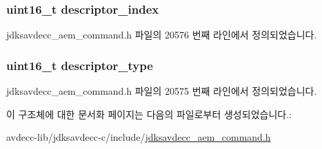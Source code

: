 \subsubsection[{\texorpdfstring{descriptor\+\_\+index}{descriptor_index}}]{\setlength{\rightskip}{0pt plus 5cm}uint16\+\_\+t descriptor\+\_\+index}\hypertarget{structjdksavdecc__aem__command__set__mixer__response_a042bbc76d835b82d27c1932431ee38d4}{}\label{structjdksavdecc__aem__command__set__mixer__response_a042bbc76d835b82d27c1932431ee38d4}


jdksavdecc\+\_\+aem\+\_\+command.\+h 파일의 20576 번째 라인에서 정의되었습니다.

\subsubsection[{\texorpdfstring{descriptor\+\_\+type}{descriptor_type}}]{\setlength{\rightskip}{0pt plus 5cm}uint16\+\_\+t descriptor\+\_\+type}\hypertarget{structjdksavdecc__aem__command__set__mixer__response_ab7c32b6c7131c13d4ea3b7ee2f09b78d}{}\label{structjdksavdecc__aem__command__set__mixer__response_ab7c32b6c7131c13d4ea3b7ee2f09b78d}


jdksavdecc\+\_\+aem\+\_\+command.\+h 파일의 20575 번째 라인에서 정의되었습니다.



이 구조체에 대한 문서화 페이지는 다음의 파일로부터 생성되었습니다.\+:\begin{DoxyCompactItemize}
\item 
avdecc-\/lib/jdksavdecc-\/c/include/\hyperlink{jdksavdecc__aem__command_8h}{jdksavdecc\+\_\+aem\+\_\+command.\+h}\end{DoxyCompactItemize}
